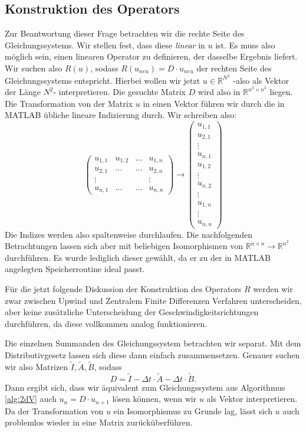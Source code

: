 \documentclass[12pt,a4paper]{scrartcl}
\numberwithin{equation}{section} %
\theoremstyle{definition}
\theoremstyle{plain}
\newcommand{\rr}{\mathbb{R}}
\begin{document}
\subsection{Konstruktion des Operators}
Zur Beantwortung dieser Frage betrachten wir die rechte Seite des Gleichungssystems. Wir stellen fest, dass diese \emph{linear} in $u$ ist. Es muss also möglich sein, einen linearen Operator zu definieren, der dasselbe Ergebnis liefert. Wir suchen also $R(u)$, sodass $R(u_{neu})=D\cdot u_{neu}$ der rechten Seite des Gleichungssystems entspricht. Hierbei wollen wir jetzt $u\in\rr^{N^2}$ -also als Vektor der Länge $N^2$- interpretieren. Die gesuchte Matrix $D$ wird also in $\rr^{n^2\times n^2}$ liegen. Die Transformation von der Matrix $u$ in einen Vektor führen wir durch die in MATLAB übliche lineare Indizierung durch. Wir schreiben also:
\begin{equation}
\label{eq:Isom}
\begin{pmatrix}
u_{1,1}&u_{1,2}&\dots&u_{1,n}\\
u_{2,1}&\dots&\dots&u_{2,n}\\
\vdots&&&\vdots\\
u_{n,1}&\dots&\dots&u_{n,n}
\end{pmatrix}\rightarrow
\begin{pmatrix}
u_{1,1}\\
u_{2,1}\\
\vdots\\
u_{n,1}\\
u_{1,2}\\
\vdots\\
u_{n,2}\\
\vdots\\
u_{1,n}\\
\vdots\\
u_{n,n}
\end{pmatrix}
\end{equation}
Die Indizes werden also spaltenweise durchlaufen. Die nachfolgenden Betrachtungen lassen sich aber mit beliebigen Isomorphismen von $\rr^{n\times n}\to\rr^{n^2}$ durchführen. Es wurde lediglich dieser gewählt, da er zu der in MATLAB angelegten Speicherroutine ideal passt. 
\par Für die jetzt folgende Diskussion der Konstruktion des Operators $R$ werden wir zwar zwischen Upwind und Zentralem Finite Differenzen Verfahren unterscheiden, aber keine zusätzliche Unterscheidung der Geschwindigkeitsrichtungen durchführen, da diese vollkommen analog funktionieren.\par Die einzelnen Summanden des Gleichungssystem betrachten wir separat. Mit dem Distributivgesetz lassen sich diese dann einfach zusammensetzen. Genauer suchen wir also Matrizen $\tilde{I},\tilde{A},\tilde{B}$, sodass
\begin{equation}
D=\tilde{I}-\Delta t\cdot \tilde{A}-\Delta t\cdot \tilde{B}.
\end{equation}
Dann ergibt sich, dass wir äquivalent zum Gleichungssystem aus Algorithmus \ref{alg:2dV} auch $u_n=D\cdot u_{n+1}$ lösen können, wenn wir $u$ als Vektor interpretieren. Da der Transformation von $u$ ein Isomorphismus zu Grunde lag, lässt sich $u$ auch problemlos wieder in eine Matrix zurücküberführen.
\end{document}
